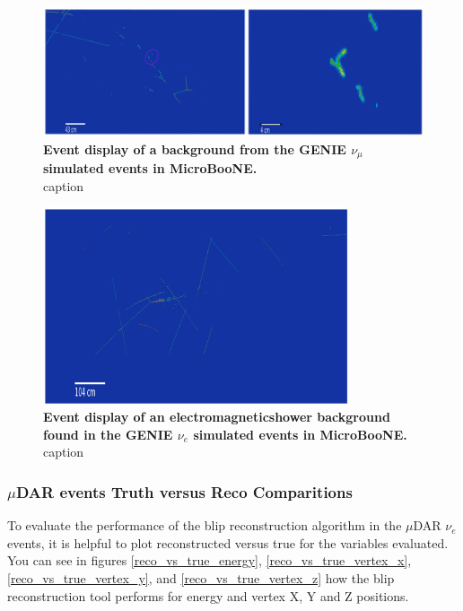 \begin{figure}[h!]
    \centering
    \includegraphics[width=120mm]{Figures/numu_evd.jpeg}
    \caption[Event display of a background from the GENIE $\nu_{\mu}$ simulated event in MicroBooNE.]{{\textbf{Event display of a background from the GENIE $\nu_{\mu}$ simulated events in MicroBooNE.}}\\ caption }
    \label{bkg_evd_2}
\end{figure}

\begin{figure}[h!]
    \centering
    \includegraphics[width=90mm]{Figures/shower_evd_2.png}
    \caption[Event display of a background from the GENIE $\nu_{\mu}$ simulated events in MicroBooNE.]{{\textbf{Event display of an electromagneticshower background found in the GENIE $\nu_{e}$ simulated events in MicroBooNE.}}\\ caption }
    \label{bkg_evd_3}
\end{figure}


\subsubsection{$\mu$DAR events Truth versus Reco Comparitions}
To evaluate the performance of the blip reconstruction algorithm in the $\mu$DAR $\nu_e$ events, it is helpful to plot reconstructed versus true for the variables evaluated. You can see in figures \ref{reco_vs_true_energy}, \ref{reco_vs_true_vertex_x}, \ref{reco_vs_true_vertex_y}, and \ref{reco_vs_true_vertex_z} how the blip reconstruction tool performs for energy and vertex X, Y and Z positions. 

